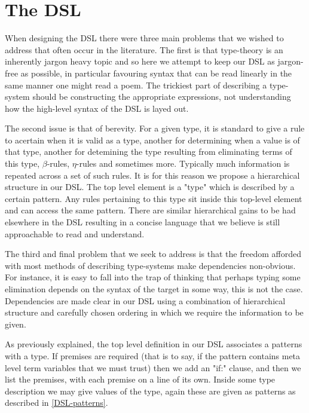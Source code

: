 \section{The DSL}
\label{DSL}

When designing the DSL there were three main problems that we wished to
address that often occur in the literature. The first is that
type-theory is an inherently jargon heavy topic and so here we attempt
to keep our DSL as jargon-free as possible, in particular favouring
syntax that can be read linearly in the same manner one might read a
poem. The trickiest part of describing a type-system should be
constructing the appropriate expressions, not understanding how the
high-level syntax of the DSL is layed out.

The second issue is that of berevity. For a given type, it is standard
to give a rule to acertain when it is valid as a type, another for
determining when a value is of that type, another for detemining the
type resulting from eliminating terms of this type, $\beta$-rules,
$\eta$-rules and sometimes more. Typically much information is
repeated across a set of such rules. It is for this reason we propose
a hierarchical structure in our DSL. The top level element is a "type"
which is described by a certain pattern. Any rules pertaining to this
type sit inside this top-level element and can access the same
pattern. There are similar hierarchical gains to be had elsewhere in
the DSL resulting in a concise language that we believe is still
approachable to read and understand.

The third and final problem that we seek to address is that the
freedom afforded with most methods of describing type-systems make
dependencies non-obvious. For instance, it is easy to fall into the
trap of thinking that perhaps typing some elimination depends on the
syntax of the target in some way, this is not the case. Dependencies
are made clear in our DSL using a combination of hierarchical
structure and carefully chosen ordering in which we require the
information to be given.

As previously explained, the top level definition in our DSL
associates a patterns with a type. If premises are required (that is
to say, if the pattern contains meta level term variables that we must
trust) then we add an "if:" clause, and then we list the premises,
with each premise on a line of its own. Inside some type description
we may give values of the type, again these are given as patterns as
described in \ref{DSL-patterns}.

